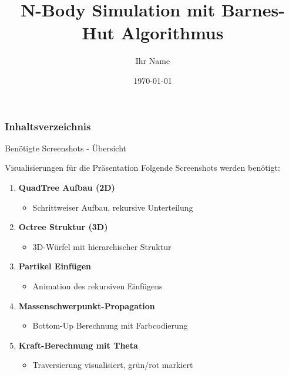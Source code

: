 \documentclass[xcolor=dvipsnames]{beamer}
\title[N-Body Simulation]{N-Body Simulation mit Barnes-Hut Algorithmus}
\author{Ihr Name}
\institute{TU Berlin}
\date{\today}
\begin{document}
\begin{frame}
  \titlepage
\end{frame}

\begin{frame}
\frametitle{Inhaltsverzeichnis}
\tableofcontents
\end{frame}

\begin{frame}{Benötigte Screenshots - Übersicht}
\begin{alertblock}{Visualisierungen für die Präsentation}
Folgende Screenshots werden benötigt:
\end{alertblock}

\begin{enumerate}
    \item \textbf{QuadTree Aufbau (2D)}
    \begin{itemize}
        \item Schrittweiser Aufbau, rekursive Unterteilung
    \end{itemize}

    \item \textbf{Octree Struktur (3D)}
    \begin{itemize}
        \item 3D-Würfel mit hierarchischer Struktur
    \end{itemize}

    \item \textbf{Partikel Einfügen}
    \begin{itemize}
        \item Animation des rekursiven Einfügens
    \end{itemize}

    \item \textbf{Massenschwerpunkt-Propagation}
    \begin{itemize}
        \item Bottom-Up Berechnung mit Farbcodierung
    \end{itemize}

    \item \textbf{Kraft-Berechnung mit Theta}
    \begin{itemize}
        \item Traversierung visualisiert, grün/rot markiert
    \end{itemize}
\end{enumerate}
\end{frame}

\end{document}
